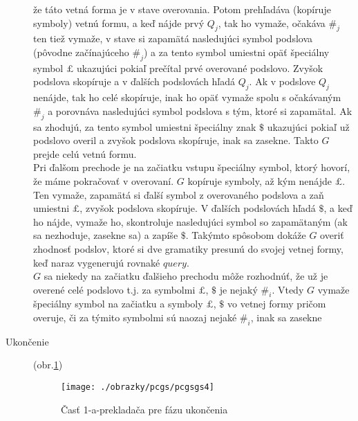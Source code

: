 \begin{dokaz}
\begin{description}
  že táto vetná forma je v stave overovania. Potom prehľadáva
  (kopíruje symboly) vetnú formu, a keď nájde prvý $Q_j$, tak ho
  vymaže, očakáva $\#_j$ ten tiež vymaže, v stave si zapamätá
  nasledujúci symbol podslova (pôvodne začínajúceho $\#_j$) a za
  tento symbol umiestni opäť špeciálny symbol $\pounds$ ukazujúci pokiaľ
  prečítal prvé overované podslovo. Zvyšok podslova skopíruje a v
  ďalších podslovách hľadá $Q_j$. Ak v podslove $Q_j$ nenájde, tak
  ho celé skopíruje, inak ho opäť vymaže spolu s očakávaným $\#_j$
  a porovnáva nasledujúci symbol podslova s tým, ktoré si
  zapamätal. Ak sa zhodujú, za tento symbol umiestni špeciálny
  znak $\$$ ukazujúci pokiaľ už podslovo overil a zvyšok podslova
  skopíruje, inak sa zasekne. Takto $G$ prejde celú vetnú formu.
  \\ Pri ďalšom prechode je na začiatku vstupu špeciálny symbol,
  ktorý hovorí, že máme pokračovať v overovaní. $G$ kopíruje
  symboly, až kým nenájde $\pounds$. Ten vymaže, zapamätá si ďalší
  symbol z overovaného podslova a zaň umiestni $\pounds$, zvyšok
  podslova skopíruje. V ďalších podslovách hľadá $\$$, a keď ho
  nájde, vymaže ho, skontroluje nasledujúci symbol so zapamätaným
  (ak sa nezhoduje, zasekne sa) a zapíše $\$$. Takýmto spôsobom
  dokáže $G$ overiť zhodnosť podslov, ktoré si dve gramatiky
  presunú do svojej vetnej formy, keď naraz vygenerujú rovnaké
  $query$.
  \\ $G$ sa niekedy na začiatku ďalšieho prechodu môže rozhodnúť,
  že už je overené celé podslovo t.j. za symbolmi $\pounds$, $\$$
  je nejaký $\#_i$. Vtedy $G$ vymaže špeciálny symbol na začiatku
  a symboly $\pounds$, $\$$ vo vetnej formy pričom overuje, či za
  týmito symbolmi sú naozaj nejaké $\#_i$, inak sa zasekne

  \item[Ukončenie] (obr.\ref{pcgsgs4})

\begin{figure}[ht]
  \centering
  \texttt{[image: ./obrazky/pcgs/pcgsgs4]}
  \caption{Časť 1-a-prekladača pre fázu ukončenia}\label{pcgsgs4}
\end{figure}


\end{description}
\end{dokaz}

